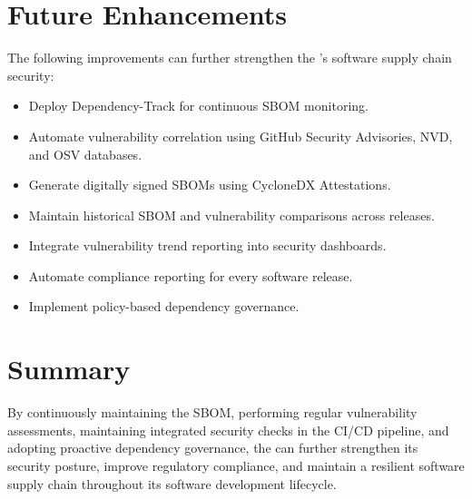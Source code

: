 \section{Future Enhancements}

The following improvements can further strengthen the \textbf{\ProjectName}'s software supply chain security:
\begin{itemize}
\item Deploy Dependency-Track for continuous SBOM monitoring.
\item Automate vulnerability correlation using GitHub Security Advisories, NVD, and OSV databases.
\item Generate digitally signed SBOMs using CycloneDX Attestations.
\item Maintain historical SBOM and vulnerability comparisons across releases.
\item Integrate vulnerability trend reporting into security dashboards.
\item Automate compliance reporting for every software release.
\item Implement policy-based dependency governance.
\end{itemize}

\vspace{0.4cm}


\section{Summary}


By continuously maintaining the SBOM, performing regular vulnerability assessments, maintaining integrated security checks in the CI/CD pipeline, and adopting proactive dependency governance, the \textbf{\ProjectName} can further strengthen its security posture, improve regulatory compliance, and maintain a resilient software supply chain throughout its software development lifecycle.